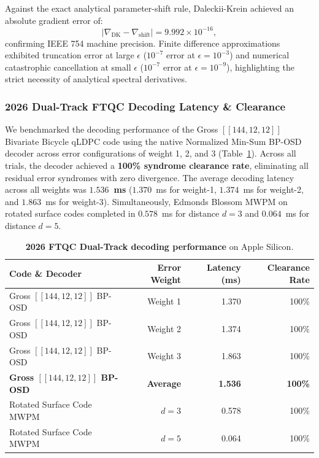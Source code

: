 \documentclass[aps,prx,twocolumn,superscriptaddress,nofootinbib]{revtex4-2}
\begin{document}
Against the exact analytical parameter-shift rule, Daleckii-Krein achieved an absolute gradient error of:
\begin{equation}
    |\nabla_{\text{DK}} - \nabla_{\text{shift}}| = 9.992 \times 10^{-16},
\end{equation}
confirming IEEE 754 machine precision. Finite difference approximations exhibited truncation error at large $\epsilon$ ($10^{-7}$ error at $\epsilon=10^{-3}$) and numerical catastrophic cancellation at small $\epsilon$ ($10^{-7}$ error at $\epsilon=10^{-9}$), highlighting the strict necessity of analytical spectral derivatives.

\subsubsection{2026 Dual-Track FTQC Decoding Latency & Clearance}
We benchmarked the decoding performance of the Gross $[[144, 12, 12]]$ Bivariate Bicycle qLDPC code using the native Normalized Min-Sum BP-OSD decoder across error configurations of weight 1, 2, and 3 (Table~\ref{tab:qec_dual_track_bench}). Across all trials, the decoder achieved a \textbf{100\% syndrome clearance rate}, eliminating all residual error syndromes with zero divergence. The average decoding latency across all weights was \textbf{$1.536$~ms} ($1.370$~ms for weight-1, $1.374$~ms for weight-2, and $1.863$~ms for weight-3). Simultaneously, Edmonds Blossom MWPM on rotated surface codes completed in $0.578$~ms for distance $d=3$ and $0.064$~ms for distance $d=5$.

\begin{table}[h]
\centering
\caption{\textbf{2026 FTQC Dual-Track decoding performance} on Apple Silicon.}
\label{tab:qec_dual_track_bench}
\begin{tabular}{@{}lrrr@{}}
\toprule
\textbf{Code \& Decoder} & \textbf{Error Weight} & \textbf{Latency (ms)} & \textbf{Clearance Rate} \\
\midrule
Gross $[[144, 12, 12]]$ BP-OSD & Weight 1 & 1.370 & 100\% \\
Gross $[[144, 12, 12]]$ BP-OSD & Weight 2 & 1.374 & 100\% \\
Gross $[[144, 12, 12]]$ BP-OSD & Weight 3 & 1.863 & 100\% \\
\textbf{Gross $[[144, 12, 12]]$ BP-OSD} & \textbf{Average} & \textbf{1.536} & \textbf{100\%} \\
Rotated Surface Code MWPM & $d = 3$ & 0.578 & 100\% \\
Rotated Surface Code MWPM & $d = 5$ & 0.064 & 100\% \\
\bottomrule
\end{tabular}
\end{table}
\end{document}
